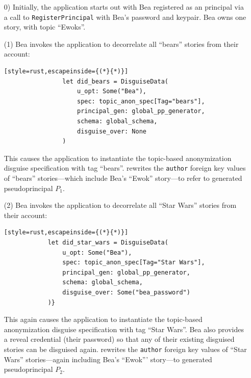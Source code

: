 \begin{enumerate}[nosep]
    \item[0)] Initially, the application starts out with Bea registered as an
        \sys principal via a call to \texttt{RegisterPrincipal} with Bea's
        password and keypair. Bea owns one story, with topic ``Ewoks''.

    \item[(1)] Bea invokes the application to decorrelate all ``bears'' stories 
        from their account: 

            \vspace{12pt}
            \begin{lstlisting}[style=rust,escapeinside={(*}{*)}]
                let did_bears = DisguiseData(
                    u_opt: Some("Bea"), 
                    spec: topic_anon_spec[Tag="bears"],
                    principal_gen: global_pp_generator,
                    schema: global_schema,
                    disguise_over: None
                )
            \end{lstlisting}

        This causes the application to instantiate the
        topic-based anonymization disguise specification with tag ``bears''.
        \sys rewrites the \texttt{author} foreign key values of ``bears''
         stories---which include Bea's ``Ewok'' story---to refer to generated
        pseudoprincipal $P_1$.

        \item[(2)] Bea invokes the application to decorrelate all ``Star Wars''
            stories from
        their account: 

        \vspace{12pt}
        \begin{lstlisting}[style=rust,escapeinside={(*}{*)}]
            let did_star_wars = DisguiseData(
                u_opt: Some("Bea"), 
                spec: topic_anon_spec[Tag="Star Wars"],
                principal_gen: global_pp_generator,
                schema: global_schema,
                disguise_over: Some("bea_password")
            )}
        \end{lstlisting}

        This again causes the application to instantiate the topic-based
        anonymization disguise specification with tag ``Star Wars''. Bea also
        provides a reveal credential (\eg their password) so that any of their existing
        disguised stories can be disguised again. \sys rewrites the
        \texttt{author} foreign key values of ``Star Wars'' stories---again
        including Bea's ``Ewok''' story---to generated pseudoprincipal $P_2$.
    

\end{enumerate}
